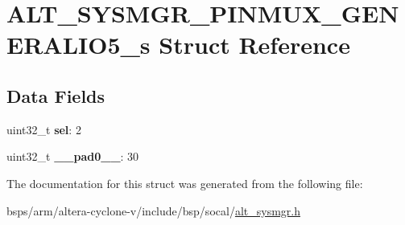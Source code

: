 \hypertarget{structALT__SYSMGR__PINMUX__GENERALIO5__s}{}\section{A\+L\+T\+\_\+\+S\+Y\+S\+M\+G\+R\+\_\+\+P\+I\+N\+M\+U\+X\+\_\+\+G\+E\+N\+E\+R\+A\+L\+I\+O5\+\_\+s Struct Reference}
\label{structALT__SYSMGR__PINMUX__GENERALIO5__s}
\subsection*{Data Fields}
\begin{DoxyCompactItemize}
\item 
\mbox{\label{structALT__SYSMGR__PINMUX__GENERALIO5__s_a436e17c25481c186d3a9fa2f7535b660}} 
uint32\+\_\+t {\bfseries sel}\+: 2
\item 
\mbox{\label{structALT__SYSMGR__PINMUX__GENERALIO5__s_a9185f1fecd98cbb613e24fa1fc3e0c09}} 
uint32\+\_\+t {\bfseries \+\_\+\+\_\+pad0\+\_\+\+\_\+}\+: 30
\end{DoxyCompactItemize}


The documentation for this struct was generated from the following file\+:\begin{DoxyCompactItemize}
\item 
bsps/arm/altera-\/cyclone-\/v/include/bsp/socal/\mbox{\hyperlink{alt__sysmgr_8h}{alt\+\_\+sysmgr.\+h}}\end{DoxyCompactItemize}
